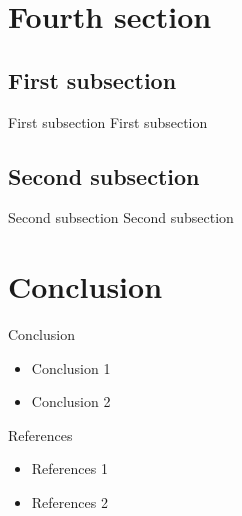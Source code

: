 \documentclass[10pt]{beamer}
\begin{document}
\section{Fourth section}
\subsection{First subsection}
\begin{frame}{First subsection}
    First subsection
\end{frame}

\subsection{Second subsection}
\begin{frame}{Second subsection}
    Second subsection
\end{frame}

\section{Conclusion}
\begin{frame}{Conclusion}
    \begin{itemize}
        \item Conclusion 1
        \item Conclusion 2
    \end{itemize}
\end{frame}

\begin{frame}[plain]
\end{frame}

\begin{frame}[plain]
\end{frame}

\begin{frame}{References}
    \begin{itemize}
        \item References 1
        \item References 2
    \end{itemize}
\end{frame}
\end{document}
